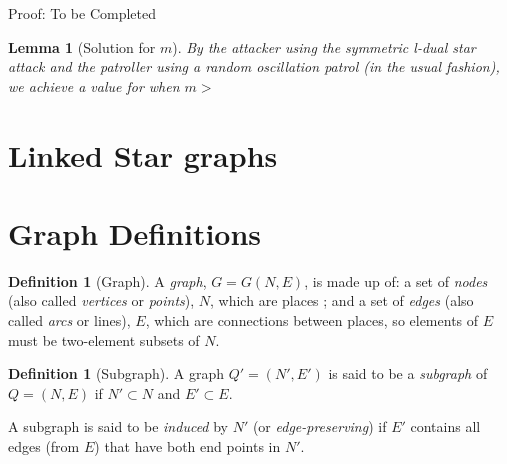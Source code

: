 \documentclass[a4paper,10pt]{article}
\newtheorem{lemma}[theorem]{Lemma}
\theoremstyle{definition}
\newtheorem{definition}[theorem]{Definition}
\theoremstyle{definition}
\theoremstyle{remark}
\theoremstyle{definition}
\begin{document}
Proof: To be Completed

\begin{lemma}[Solution for $m  $]
By the attacker using the symmetric l-dual star attack and the patroller using a random oscillation patrol (in the usual fashion), we achieve a value for when $m >$
\end{lemma}


\section{Linked Star graphs}




\newpage
\appendix
{}
\appendixpage
\addappheadtotoc
\section{Graph Definitions}

\begin{definition}[Graph]
A \textit{graph}, $G=G(N,E)$, is made up of: a set of \textit{nodes} (also called \textit{vertices} or \textit{points}), $N$, which are places ; and a set of \textit{edges} (also called \textit{arcs} or lines), $E$, which are connections between places, so elements of $E$ must be two-element subsets of $N$.
\end{definition}


\begin{definition}[Subgraph]
A graph $Q'=(N',E')$ is said to be a \textit{subgraph} of $Q=(N,E)$ if $N' \subset N$ and $E' \subset E$.

A subgraph is said to be \textit{induced} by $N'$ (or \textit{edge-preserving}) if $E'$ contains all edges (from $E$) that have both end points in $N'$.
\end{definition}
\end{document}
